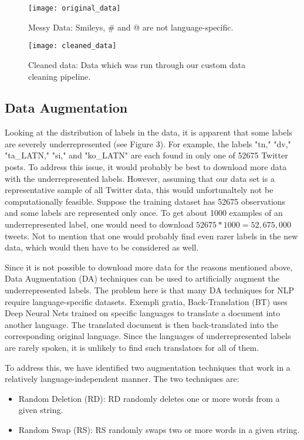 \documentclass[fleqn,10pt]{SelfArx} %
\begin{document}
\begin{figure}[ht]\centering
	\texttt{[image: original\_data]}
	\caption{Messy Data: Smileys, \# and @ are not language-specific.}
	\label{fig:results}
\end{figure}

\begin{figure}[ht]\centering
	\texttt{[image: cleaned\_data]}
	\caption{Cleaned data: Data which was run through our custom data cleaning pipeline.}
	\label{fig:results}
\end{figure}

\subsection{Data Augmentation}

Looking at the distribution of labels in the data, it is apparent that some labels are severely underrepresented (see Figure 3). For example, the labels "tn," "dv," "ta\_LATN," "si," and "ko\_LATN" are each found in only one of 52675 Twitter posts. To address this issue, it would probably be best to download more data with the underrepresented labels. However, assuming that our data set is a representative sample of all Twitter data, this would unfortunaltely not be computationally feasible. Suppose the training dataset has 52675 observations and some labels are represented only once. To get about 1000 examples of an underrepresented label, one would need to download $52675 * 1000 = 52,675,000$ tweets. Not to mention that one would probably find even rarer labels in the new data, which would then have to be considered as well. \newline

Since it is not possible to download more data for the reasons mentioned above, Data Augmentation (DA) techniques can be used to artificially augment the underrepresented labels. The problem here is that many DA techniques for NLP require language-specific datasets. Exempli gratia, Back-Translation (BT) uses Deep Neural Nets trained on specific languages to translate a document into another language. The translated document is then back-translated into the corresponding original language. Since the languages of underrepresented labels are rarely spoken, it is unlikely to find such translators for all of them. \newline

To address this, we have identified two augmentation techniques that work in a relatively language-independent manner. The two techniques are:
\begin{itemize}
	\item Random Deletion (RD): RD randomly deletes one or more words from a given string.
	\item Random Swap (RS): RS randomly swaps two or more words in a given string.
\end{itemize}
\end{document}
